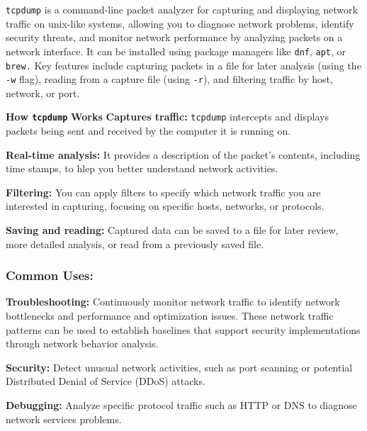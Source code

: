 \begin{notebox}
    \verb|tcpdump| is a command-line packet analyzer for capturing and displaying network traffic on unix-like systems, allowing you to diagnose network problems, identify security threats, and monitor network performance by analyzing packets on a network interface. It can be installed using package managers like \verb|dnf|, \verb|apt|, or \verb|brew.| Key features include capturing packets in a file for later analysis (using the \texttt{-w} flag), reading from a capture file (using \texttt{-r}), and filtering traffic by host, network, or port.

\textbf{How \texttt{tcpdump}} \textbf{Works}
\textbf{Captures traffic:}
\texttt{tcpdump} intercepts and displays packets being sent and received by the computer it is running on.

\textbf{Real-time analysis:}
It provides a description of the packet's contents, including time stamps, to hlep you better understand network activities.

\textbf{Filtering:}
You can apply filters to specify which network traffic you are interested in capturing, focusing on specific hosts, networks, or protocols.

\textbf{Saving and reading:}
Captured data can be saved to a file for later review, more detailed analysis, or read from a previously saved file.

\subsubsection{Common Uses:}
\textbf{Troubleshooting:}
Continuously monitor network traffic to identify network bottlenecks and performance and optimization issues. These network traffic patterns can be used to establish baselines that support security implementations through network behavior analysis.

\textbf{Security:}
Detect unusual network activities, such as port scanning or potential Distributed Denial of Service (DDoS) attacks.

\textbf{Debugging:}
Analyze specific protocol traffic such as HTTP or DNS to diagnose network services problems.


\end{notebox}
